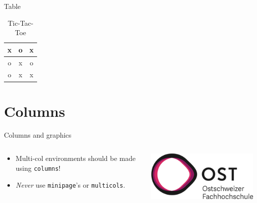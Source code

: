 \documentclass[aspectratio=169,envcountsect]{beamer}    %
\begin{document}
\begin{frame}{Table}
	\begin{table}[h]
		\centering
		\caption{Tic-Tac-Toe}
		\label{tab:tictactoe}
		{\Large
		\begin{tabular}{|c|c|c|}
			\hline
			x & o & x\\\hline
			o & x & o\\\hline
			o & x & x\\\hline
		\end{tabular}}
	\end{table}	
\end{frame}

\section{Columns}
\begin{frame}{Columns and graphics}
    \begin{columns}[onlytextwidth]
        \begin{column}{0.5\textwidth}
            \begin{itemize}
                \item Multi-col environments should be made using \texttt{columns}!
                \item \emph{Never} use \texttt{minipage}'s or \texttt{multicols}.
            \end{itemize}
        \end{column}
        \begin{column}{0.5\textwidth}
            \centering
            \includegraphics[width=0.6\linewidth]{header/ost_logo}
        \end{column}
    \end{columns}
\end{frame}
%
\end{document}
